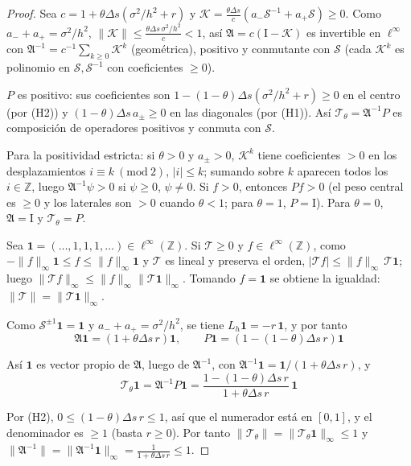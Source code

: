 \documentclass[11pt,letterpaper]{article}
\theoremstyle{plain}
\theoremstyle{definition}
\theoremstyle{remark}
\numberwithin{equation}{section}
\newcommand{\Z}{\mathbb{Z}}
\newcommand{\norm}[1]{\lVert #1\rVert}
\newcommand{\Sh}{\mathcal{S}}
\newcommand{\Id}{\mathrm{I}}
\newcommand{\Top}{\mathcal{T}}
\begin{document}
	\begin{proof}
		Sea \(c=1+\theta\Delta s(\sigma^2/h^2+r)\) y \(\mathcal K=\frac{\theta\Delta s}{c}(a_-\Sh^{-1}+a_+\Sh)\ge0\). Como \(a_-+a_+=\sigma^2/h^2\), \(\norm{\mathcal K}\le\frac{\theta\Delta s\,\sigma^2/h^2}{c}<1\), así \(\mathfrak A=c(\Id-\mathcal K)\) es invertible en \(\ell^\infty\) con \(\mathfrak A^{-1}=c^{-1}\sum_{k\ge0}\mathcal K^k\) (geométrica), positivo y conmutante con \(\Sh\) (cada \(\mathcal K^k\) es polinomio en \(\Sh,\Sh^{-1}\) con coeficientes \(\ge0\)).
		
		\(P\) es positivo: sus coeficientes son \(1-(1-\theta)\Delta s(\sigma^2/h^2+r)\ge0\) en el centro (por (H2)) y \((1-\theta)\Delta s\,a_\pm\ge0\) en las diagonales (por (H1)). Así \(\Top_\theta=\mathfrak A^{-1}P\) es composición de operadores positivos y conmuta con \(\Sh\).
		
		Para la positividad estricta: si \(\theta>0\) y \(a_\pm>0\), \(\mathcal K^k\) tiene coeficientes \(>0\) en los desplazamientos \(i\equiv k\ (\mathrm{mod}\ 2)\), \(|i|\le k\); sumando sobre \(k\) aparecen todos los \(i\in\Z\), luego \(\mathfrak A^{-1}\psi>0\) si \(\psi\ge0\), \(\psi\ne0\). Si \(f>0\), entonces \(Pf>0\) (el peso central es \(\ge0\) y los laterales son \(>0\) cuando \(\theta<1\); para \(\theta=1\), \(P=\Id\)). Para \(\theta=0\), \(\mathfrak A=\Id\) y \(\Top_\theta=P\).
		
		Sea \(\mathbf 1=(\dots,1,1,1,\dots)\in\ell^\infty(\Z)\). Si \(\Top\ge0\) y \(f\in\ell^\infty(\Z)\), como \(-\norm f_\infty\mathbf 1\le f\le\norm f_\infty\mathbf 1\) y \(\Top\) es lineal y preserva el orden, \(|\Top f|\le\norm f_\infty\,\Top\mathbf 1\); luego \(\norm{\Top f}_\infty\le\norm f_\infty\norm{\Top\mathbf 1}_\infty\). Tomando \(f=\mathbf 1\) se obtiene la igualdad: \(\norm \Top=\norm{\Top\mathbf 1}_\infty\).
		
		Como \(\Sh^{\pm1}\mathbf 1=\mathbf 1\) y \(a_-+a_+=\sigma^2/h^2\), se tiene \(L_h\mathbf 1=-r\,\mathbf 1\), y por tanto
		\[
		\mathfrak A\mathbf 1=(1+\theta\Delta s\,r)\mathbf 1,\qquad
		P\mathbf 1=(1-(1-\theta)\Delta s\,r)\mathbf 1
		\]
		
		Así \(\mathbf 1\) es vector propio de \(\mathfrak A\), luego de \(\mathfrak A^{-1}\), con \(\mathfrak A^{-1}\mathbf 1=\mathbf 1/(1+\theta\Delta s\,r)\), y
		\[
		\Top_\theta\mathbf 1=\mathfrak A^{-1}P\mathbf 1=\frac{1-(1-\theta)\Delta s\,r}{1+\theta\Delta s\,r}\,\mathbf 1
		\]
		
		Por (H2), \(0\le(1-\theta)\Delta s\,r\le1\), así que el numerador está en \([0,1]\), y el denominador es \(\ge1\) (basta \(r\ge0\)). Por tanto \(\norm{\Top_\theta}=\norm{\Top_\theta\mathbf 1}_\infty\le1\) y \(\norm{\mathfrak A^{-1}}=\norm{\mathfrak A^{-1}\mathbf 1}_\infty=\frac1{1+\theta\Delta s\,r}\le1\).
		
	\end{proof}
	
\end{document}
